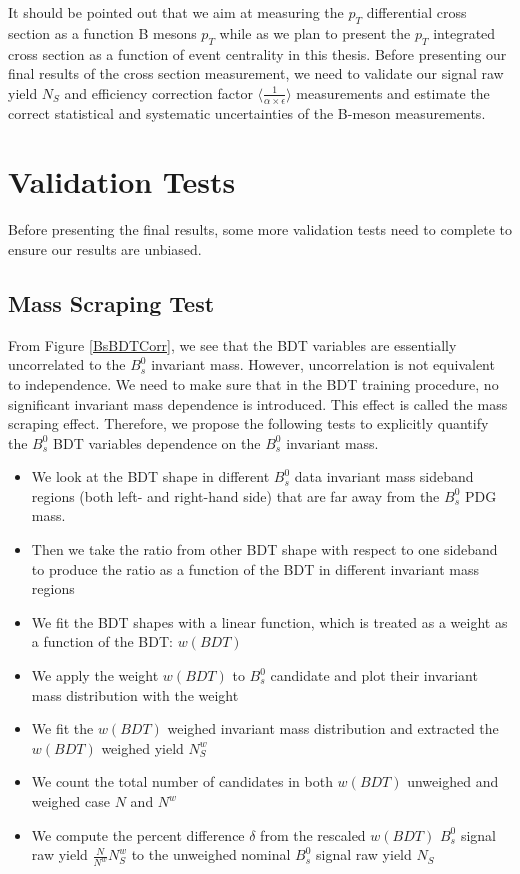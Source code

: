 It should be pointed out that we aim at measuring the $p_T$ differential cross section as a function B mesons $p_T$ while as we plan to present the $p_T$ integrated cross section as a function of event centrality in this thesis. Before presenting our final results of the cross section measurement, we need to validate our signal raw yield $N_S$ and efficiency correction factor $\langle\frac{1}{\alpha \times \epsilon} \rangle$ measurements and estimate the correct statistical and systematic uncertainties of the B-meson measurements. 

\section{Validation Tests} 

Before presenting the final results, some more validation tests need to complete to ensure our results are unbiased.

\subsection{Mass Scraping Test}

From Figure \ref{BsBDTCorr}, we see that the BDT variables are essentially uncorrelated to the $B^0_s$ invariant mass. However, uncorrelation is not equivalent to independence. We need to make sure that in the BDT training procedure, no significant invariant mass dependence is introduced. This effect is called the mass scraping effect. Therefore, we propose the following tests to explicitly quantify the $B^0_s$ BDT variables dependence on the $B^0_s$ invariant mass. 

\begin{itemize}
\item We look at the BDT shape in different $B^0_s$ data invariant mass sideband regions (both left- and right-hand side) that are far away from the $B^0_s$ PDG mass.
\item Then we take the ratio from other BDT shape with respect to one sideband to produce the ratio as a function of the BDT in different invariant mass regions
\item We fit the BDT shapes with a linear function, which is treated as a weight as a function of the BDT: $w(BDT)$
\item We apply the weight $w(BDT)$ to $B^0_s$ candidate and plot their invariant mass distribution with the weight
\item We fit the $w(BDT)$ weighed invariant mass distribution and extracted the $w(BDT)$ weighed yield $N^{w}_S$
\item We count the total number of candidates in both $w(BDT)$ unweighed and weighed case $N$ and $N^{w}$
\item We compute the percent difference $\delta$ from the rescaled $w(BDT)$ $B^0_s$ signal raw yield $\frac{N}{N^{w}} N^{w}_S$ to the unweighed nominal $B^0_s$ signal raw yield $N_S$
\end{itemize}

